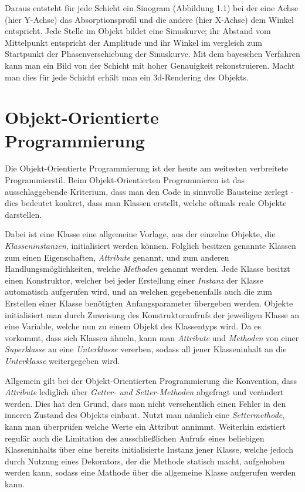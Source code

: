 \documentclass[]{dsadokumentation}
\begin{document}
Daraus entsteht für jede Schicht ein Sinogram (Abbildung 1.1) bei der eine Achse (hier Y-Achse) das Absorptionsprofil und die andere (hier X-Achse) dem Winkel entspricht. Jede Stelle im Objekt bildet eine Sinuskurve; ihr Abstand vom Mittelpunkt entspricht der Amplitude und ihr Winkel im vergleich zum Startpunkt der Phasenverschiebung der Sinuskurve. Mit dem bayeschen Verfahren  kann man ein Bild von der Schicht mit hoher Genauigkeit rekonstruieren. Macht man dies für jede Schicht erhält man ein 3d-Rendering des Objekts.

\section{Objekt-Orientierte Programmierung}
Die Objekt-Orientierte Programmierung ist der heute am weitesten verbreitete Programmierstil. Beim Objekt-Orientierten Programmieren ist das ausschlaggebende Kriterium, dass man den Code in sinnvolle Bausteine zerlegt - dies bedeutet konkret, dass man Klassen erstellt, welche oftmals reale Objekte darstellen.

Dabei ist eine Klasse eine allgemeine Vorlage, aus der einzelne Objekte, die \emph{Klasseninstanzen}, initialisiert werden können. Folglich besitzen genannte Klassen zum einen Eigenschaften, \emph{Attribute} genannt, und zum anderen Handlungsmöglichkeiten, welche \emph{Methoden} genannt werden. Jede Klasse besitzt einen Konstruktor, welcher bei jeder Erstellung einer \emph{Instanz} der Klasse automatisch aufgerufen wird, und an welchen gegebenenfalls auch die zum Erstellen einer Klasse benötigten Anfangsparameter übergeben werden. Objekte initialisiert man durch Zuweisung des Konstruktoraufrufs der jeweiligen Klasse an eine Variable, welche nun zu einem Objekt des Klassentyps wird. Da es vorkommt, dass sich Klassen ähneln, kann man \emph{Attribute} und \emph{Methoden} von einer \emph{Superklasse} an eine \emph{Unterklasse} vererben, sodass all jener Klasseninhalt an die \emph{Unterklasse} weitergegeben wird.

Allgemein gilt bei der Objekt-Orientierten Programmierung die Konvention, dass \emph{Attribute} lediglich über \emph{Getter- und Setter-Methoden} abgefragt und verändert werden. Dies hat den Grund, dass man nicht versehentlich einen Fehler in den inneren Zustand des Objekts einbaut. Nutzt man nämlich eine \emph{Settermethode}, kann man überprüfen welche Werte ein Attribut annimmt. Weiterhin existiert regulär auch die Limitation des ausschließlichen Aufrufs eines beliebigen Klasseninhalts über eine bereits initialisierte Instanz jener Klasse, welche jedoch durch Nutzung eines Dekorators, der die Methode statisch macht, aufgehoben werden kann, sodass eine Mathode über die allgemeine Klasse aufgerufen werden kann.
\end{document}
